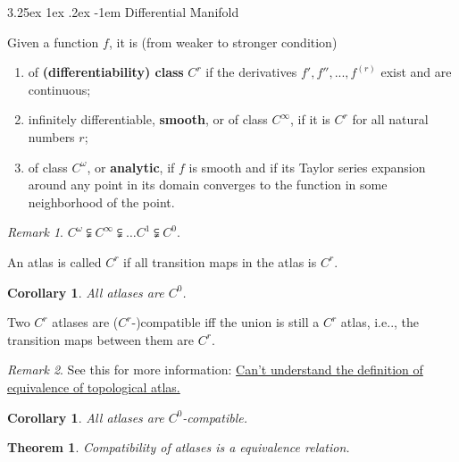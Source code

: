 \documentclass[12pt, letterpaper]{article}
\makeatletter
\newcommand\ie{i.e\@ifnextchar.{}{.\@}}
\newtheorem{cor}[prop]{Corollary}
\newtheorem{thm}[prop]{Theorem}
\renewcommand\paragraph{\@startsection{paragraph}{4}{\z@}%
	{3.25ex \@plus1ex \@minus.2ex}%
	{-1em}%
	{\normalfont\normalsize\bfseries}}
\theoremstyle{definition}
\theoremstyle{remark}
\newtheorem*{rem*}{Remark}
\theoremstyle{definition}
\theoremstyle{plain}
\numberwithin{equation}{section}
\makeatother
\begin{document}
	\paragraph{Differential Manifold}
	
	\begin{def*}
		Given a function $f$, it is (from weaker to stronger condition)
		\begin{enumerate}
			\item of \textbf{(differentiability) class} $C^r$ if the derivatives $f', f'', ..., f^{(r)}$ exist and are continuous;
			\item infinitely differentiable, \textbf{smooth}, or of class $C^{\infty}$, if it is $C^r$ for all natural numbers $r$;
			\item of class $C^{\omega}$, or \textbf{analytic}, if $f$ is smooth and if its Taylor series expansion around any point in its domain converges to the function in some neighborhood of the point.
		\end{enumerate}
	\end{def*}
	\begin{rem*}
		$C^{\omega}\subsetneqq C^{\infty}\subsetneqq \dots C^1 \subsetneqq C^0$.
	\end{rem*}

	\begin{def*}
		An atlas is called $C^r$ if all transition maps in the atlas is $C^r$.
	\end{def*}
	\begin{cor}
		All atlases are $C^0$.
	\end{cor}

	\begin{def*}
		Two $C^r$ atlases are ($C^r$-)compatible iff the union is still a $C^r$ atlas,
		\ie, the transition maps between them are $C^r$.
	\end{def*}
	\begin{rem*}
		See this for more information:
		\href{https://math.stackexchange.com/questions/3093079/cant-understand-the-definition-of-equivalence-of-topological-atlas}{Can't understand the definition of equivalence of topological atlas.}
	\end{rem*}

	\begin{cor}
		All atlases are $C^0$-compatible.
	\end{cor}
	\begin{thm}
		Compatibility of atlases is a equivalence relation.
	\end{thm}
\end{document}
